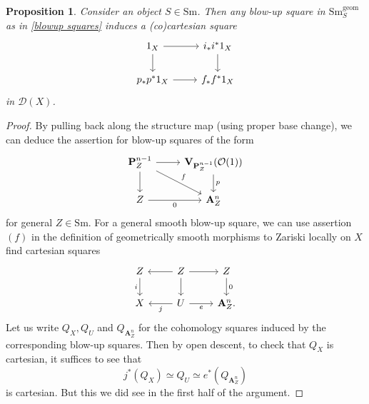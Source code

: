 \documentclass[10pt,a4paper]{amsart}
\newtheorem{prop}{Proposition}
\newcommand{\A}{\mathbf{A}}
\newcommand{\Oh}{\mathcal{O}}
\newcommand{\ProS}{\mathbf{P}}
\newcommand{\QCoh}{\mathcal{D}}
\newcommand{\Sm}{\text{Sm}}
\newcommand{\Unit}{\textbf{1}}
\newcommand{\V}{\mathbf{V}}
\newcommand{\iso}{\simeq}
\begin{document}
\begin{prop}\label{blowup excision prop}
	Consider an object $S\in \Sm$. Then any blow-up square in $\Sm_{S}^{\text{geom}}$
	as in \ref{blowup squares} induces a (co)cartesian square 
\[\begin{tikzcd}
	{\Unit_{X}} & {i_{\ast}i^{\ast}\Unit_{X}} \\
	{p_{\ast}p^{\ast}\Unit_{X}} & {f_{\ast}f^{\ast}\Unit_{X}}
	\arrow[from=1-1, to=1-2]
	\arrow[from=1-1, to=2-1]
	\arrow[from=1-2, to=2-2]
	\arrow[from=2-1, to=2-2]
\end{tikzcd}\]
   in $\QCoh(X)$.
\end{prop}

\begin{proof}
	By pulling back along the structure map (using proper base change), we can deduce the 
	assertion for blow-up squares of the form 
\[\begin{tikzcd}
	\ProS_{Z}^{n-1} & \V_{\ProS^{n-1}_{Z}}(\Oh(1)) \\
	Z & \A^{n}_{Z}
	\arrow[from=1-1, to=1-2]
	\arrow[from=1-1, to=2-1]
	\arrow["p", from=1-2, to=2-2]
	\arrow["0"', from=2-1, to=2-2]
	\arrow["f", from=1-1, to=2-2]
\end{tikzcd}\]
   for general $Z\in \Sm$. For a general smooth blow-up square, we can use assertion $(f)$ in the 
   definition of geometrically smooth morphisms to Zariski locally on $X$ find cartesian squares 
\[\begin{tikzcd}
	Z & Z & Z \\
	X & U & {\A^{n}_{Z}}
	\arrow["i"', from=1-1, to=2-1]
	\arrow[from=1-2, to=1-1]
	\arrow[from=1-2, to=1-3]
	\arrow[from=1-2, to=2-2]
	\arrow["0", from=1-3, to=2-3]
	\arrow["j", from=2-2, to=2-1]
	\arrow["e"', from=2-2, to=2-3].
\end{tikzcd}\]
   Let us write $Q_{X}, Q_{U}$ and $Q_{\A^{n}_{Z}}$ for the cohomology squares induced by the corresponding blow-up squares. 
   Then by open descent, to check that $Q_{X}$ is cartesian, it suffices to see that 
      $$j^{\ast}(Q_{X})\iso Q_{U} \iso e^{\ast}(Q_{\A^{n}_{Z}})$$
	is cartesian. But this we did see in the first half of the argument. 
\end{proof}
\end{document}
